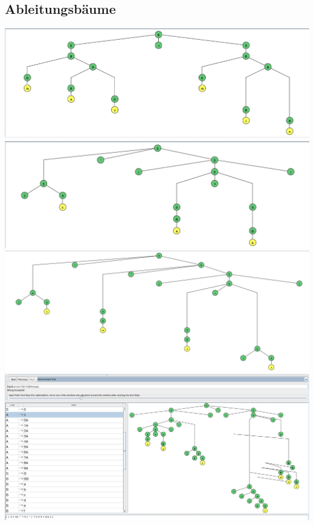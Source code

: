 \documentclass[a4paper,12pt,titlepage]{article}
\begin{document}
\subsection{Ableitungsbäume}
\includegraphics[width=1.0\textwidth]{syntaxtree_task8_1.png}\\
\includegraphics[width=1.0\textwidth]{syntaxtree_task8_2.png}\\
\includegraphics[width=1.0\textwidth]{syntaxtree_task8_3.png}\\
\includegraphics[width=1.0\textwidth]{syntaxtree_task8_4.png}\\
\end{document}

